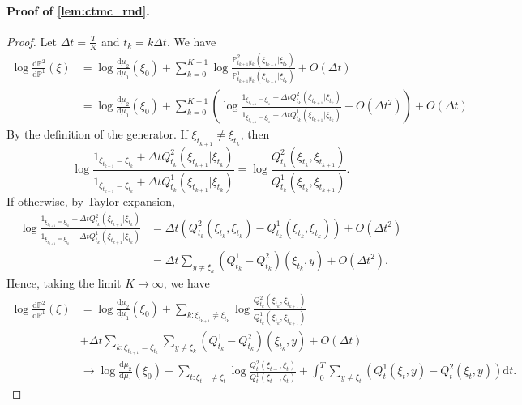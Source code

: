 \documentclass{article}
\theoremstyle{remark}
\newcommand{\ro}[1]{\left(#1\right)} %
\renewcommand{\P}{\mathbb{P}}
\renewcommand{\d}{\mathrm{d}}
\newcommand{\de}[2]{\frac{\mathrm{d}#1}{\mathrm{d}#2}} %
\begin{document}
\paragraph{Proof of \cref{lem:ctmc_rnd}.}
\begin{proof}
Let $\Delta t=\frac{T}{K}$ and $t_k=k\Delta t$. We have
\begin{align*}
    \log\de{\P^2}{\P^1}(\xi)&=\log\de{\mu_2}{\mu_1}(\xi_0)+\sum_{k=0}^{K-1}\log\frac{\P^2_{t_{k+1}|t_k}(\xi_{t_{k+1}}|\xi_{t_k})}{\P^1_{t_{k+1}|t_k}(\xi_{t_{k+1}}|\xi_{t_k})}+O(\Delta t) \\
    & =\log\de{\mu_2}{\mu_1}(\xi_0)+\sum_{k=0}^{K-1}\ro{\log\frac{1_{\xi_{t_{k+1}}=\xi_{t_k}}+\Delta tQ^2_{t_k}(\xi_{t_{k+1}}|\xi_{t_k})}{1_{\xi_{t_{k+1}}=\xi_{t_k}}+\Delta tQ^1_{t_k}(\xi_{t_{k+1}}|\xi_{t_k})}+O(\Delta t^2)}+O(\Delta t)
\end{align*}
By the definition of the generator. If $\xi_{t_{k+1}}\ne\xi_{t_k}$, then 
$$\log\frac{1_{\xi_{t_{k+1}}=\xi_{t_k}}+\Delta tQ^2_{t_k}(\xi_{t_{k+1}}|\xi_{t_k})}{1_{\xi_{t_{k+1}}=\xi_{t_k}}+\Delta tQ^1_{t_k}(\xi_{t_{k+1}}|\xi_{t_k})}=\log\frac{Q^2_{t_k}(\xi_{t_k},\xi_{t_{k+1}})}{Q^1_{t_k}(\xi_{t_k},\xi_{t_{k+1}})}.$$
If otherwise, by Taylor expansion,
\begin{align*}
    \log\frac{1_{\xi_{t_{k+1}}=\xi_{t_k}}+\Delta tQ^2_{t_k}(\xi_{t_{k+1}}|\xi_{t_k})}{1_{\xi_{t_{k+1}}=\xi_{t_k}}+\Delta tQ^1_{t_k}(\xi_{t_{k+1}}|\xi_{t_k})}&=\Delta t(Q^2_{t_k}(\xi_{t_k},\xi_{t_k})-Q^1_{t_k}(\xi_{t_k},\xi_{t_k}))+O(\Delta t^2)\\
    &=\Delta t\sum_{y\ne\xi_k}(Q^1_{t_k}-Q^2_{t_k})(\xi_{t_k},y)+O(\Delta t^2).
\end{align*}
Hence, taking the limit $K\to\infty$, we have
\begin{align*}
    \log\de{\P^2}{\P^1}(\xi)&=\log\de{\mu_2}{\mu_1}(\xi_0)+\sum_{k:\xi_{t_{k+1}}\ne\xi_{t_k}}\log\frac{Q^2_{t_k}(\xi_{t_k},\xi_{t_{k+1}})}{Q^1_{t_k}(\xi_{t_k},\xi_{t_{k+1}})}\\
    &+\Delta t\sum_{k:\xi_{t_{k+1}}=\xi_{t_k}}\sum_{y\ne\xi_k}(Q^1_{t_k}-Q^2_{t_k})(\xi_{t_k},y)+O(\Delta t)\\
    &\to\log\de{\mu_2}{\mu_1}(\xi_0)+\sum_{t:\xi_{t-}\ne\xi_t}\log\frac{Q^2_t(\xi_{t-},\xi_t)}{Q^1_t(\xi_{t-},\xi_t)}+\int_0^T\sum_{y\ne\xi_t}(Q^1_t(\xi_t,y)-Q^2_t(\xi_t,y))\d t.
\end{align*}
\end{proof}


%
%
%
%

%
%
%
%
%
\end{document}
